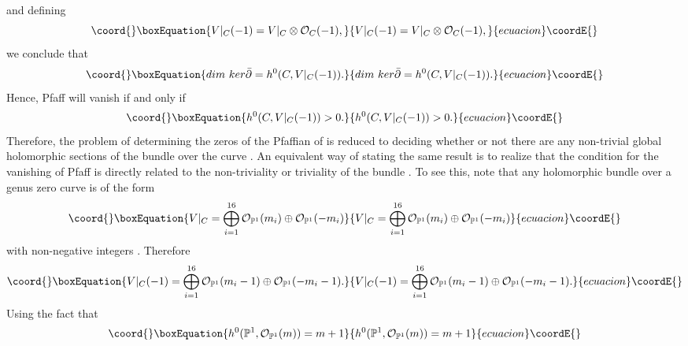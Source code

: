\documentclass[a4paper,12pt]{article}
\numberwithin{equation}{section}
\theoremstyle{plain}
\begin{document}
%
and defining
%
\begin{equation}\coord{}\boxEquation{
V|_C (-1) =  V|_{C} \otimes {\cal O}_{C}(-1),
\label{27}
}{
V|_C (-1) =  V|_{C} \otimes {\cal O}_{C}(-1),
}{ecuacion}\coordE{}\end{equation}
%
we conclude that
%
\begin{equation}\coord{}\boxEquation{
dim{\ } ker \bar \partial = h^{0} (C, V|_{C} (-1)).
\label{28}
}{
dim{\ } ker \bar \partial = h^{0} (C, V|_{C} (-1)).
}{ecuacion}\coordE{}\end{equation}
Hence, Pfaff\coordHE{} will vanish if and only if
%
\begin{equation}\coord{}\boxEquation{
h^{0} (C, V|_{C} (-1))>0.
\label{29}
}{
h^{0} (C, V|_{C} (-1))>0.
}{ecuacion}\coordE{}\end{equation}
%
Therefore, the problem of determining the zeros of the Pfaffian
of \coordHE{} is reduced to deciding whether or not there are
any
non-trivial global holomorphic sections of the bundle \coordHE{} over
the
curve \coordHE{}. An equivalent way of stating the same result is to realize that
the condition for the vanishing of Pfaff\coordHE{} is directly
related
to the non-triviality or triviality of the bundle \coordHE{}. To see this,
note
that any holomorphic \coordHE{} bundle \coordHE{} over a genus
zero
curve \coordHE{} is of the form
%
\begin{equation}\coord{}\boxEquation{
V|_{C} = \bigoplus_{i=1}^{16} {\cal O}_{{\mathbb P}^{1}}(m_i) \oplus
{\cal O}_{{\mathbb P}^{1}}(-m_i)
\label{30}
}{
V|_{C} = \bigoplus_{i=1}^{16} {\cal O}_{{\mathbb P}^{1}}(m_i) \oplus
{\cal O}_{{\mathbb P}^{1}}(-m_i)
}{ecuacion}\coordE{}\end{equation}
%
with non-negative integers \coordHE{}. Therefore
%
\begin{equation}\coord{}\boxEquation{
V|_{C}(-1) = \bigoplus_{i=1}^{16} {\cal O}_{{\mathbb P}^{1}}(m_i-1)
\oplus {\cal O}_{{\mathbb P}^{1}}(-m_i-1).
\label{31}
}{
V|_{C}(-1) = \bigoplus_{i=1}^{16} {\cal O}_{{\mathbb P}^{1}}(m_i-1)
\oplus {\cal O}_{{\mathbb P}^{1}}(-m_i-1).
}{ecuacion}\coordE{}\end{equation}
%
Using the fact that
%
\begin{equation}\coord{}\boxEquation{
h^{0}({\mathbb P}^1, {\cal O}_{{\mathbb P}^1} (m)) = m+1
\label{alpha}
}{
h^{0}({\mathbb P}^1, {\cal O}_{{\mathbb P}^1} (m)) = m+1
}{ecuacion}\coordE{}\end{equation}
\end{document}

